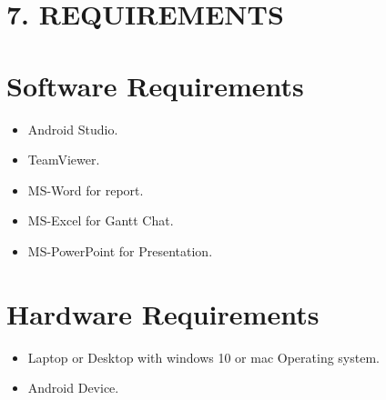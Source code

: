 \section*{\LARGE 7. REQUIREMENTS}
\section*{Software Requirements}
\begin{itemize}
    \item Android Studio.
    \item TeamViewer.
    \item MS-Word for report.
     \item MS-Excel for Gantt Chat.
     \item MS-PowerPoint for Presentation.
\end{itemize}

\section*{Hardware Requirements}
\begin{itemize}
    \item Laptop or Desktop with windows 10 or mac Operating system.
    \item Android Device.
\end{itemize}
